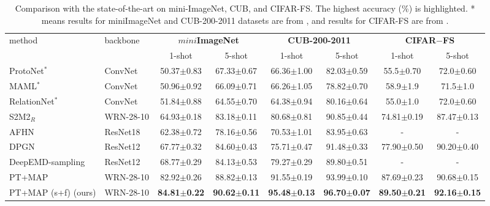 \documentclass[10pt, conference, compsocconf]{IEEEtran}
\begin{document}
\begin{table*}[t]
\centering
\caption{Comparison with the state-of-the-art on mini-ImageNet, CUB, and CIFAR-FS. The highest accuracy (\%) is highlighted. * means results for miniImageNet and CUB-200-2011 datasets are from \cite{chen2019closer}, and results for CIFAR-FS are from \cite{bertinetto2018meta}.}\begin{tabular}{l|l|cc||cc||cc}
\toprule
\multirow{2}{*}{method} & \multirow{2}{*}{backbone} & \multicolumn{2}{c||}{\bf{$\textit{mini}$ImageNet}} & \multicolumn{2}{c||}{\bf{CUB-200-2011}} & \multicolumn{2}{c}{\bf{CIFAR$-$FS}}  \\
& & 1-shot& 5-shot& 1-shot& 5-shot& 1-shot& 5-shot\\ \hline

ProtoNet$^{*}$ \cite{snell2017prototypical}& ConvNet&  50.37$\pm$0.83 & 67.33$\pm$0.67 & 66.36$\pm$1.00  & 82.03$\pm$0.59 & 55.5$\pm$0.70 & 72.0$\pm$0.60  \\
MAML$^{*}$ \cite{finn2017model} & ConvNet&  50.96$\pm$0.92 & 66.09$\pm$0.71 & 66.26$\pm$1.05 & 78.82$\pm$0.70 & 58.9$\pm$1.9 & 71.5$\pm$1.0\\
RelationNet$^{*}$ \cite{sung2018learning}& ConvNet&  51.84$\pm$0.88 & 64.55$\pm$0.70 & 64.38$\pm$0.94 & 80.16$\pm$0.64 & 55.0$\pm$1.0 & 72.0$\pm$0.60\\ \hline

S2M2$_{R}$ \cite{mangla2020charting}&WRN-28-10 & 64.93$\pm$0.18 &83.18$\pm$0.11 & 80.68$\pm$0.81 &90.85$\pm$0.44 & 74.81$\pm$0.19 &87.47$\pm$0.13 \\
AFHN \cite{li2020adversarial}& ResNet18  & 62.38$\pm$0.72 & 78.16$\pm$0.56 & 70.53$\pm$1.01 & 83.95$\pm$0.63 & - & -\\
DPGN \cite{yang2020dpgn}& ResNet12  & 67.77$\pm$0.32 & 84.60$\pm$0.43 & 75.71$\pm$0.47 & 91.48$\pm$0.33 & 77.90$\pm$0.50 & 90.20$\pm$0.40 \\
DeepEMD-sampling \cite{zhang2020deepemd}& ResNet12  & 68.77$\pm$0.29 & 84.13$\pm$0.53 & 79.27$\pm$0.29 & 89.80$\pm$0.51 & - & - \\
PT+MAP \cite{hu2020leveraging} & WRN-28-10 &82.92$\pm$0.26 & 88.82$\pm$0.13 &91.55$\pm$0.19 & 93.99$\pm$0.10 &87.69$\pm$0.23 & 90.68$\pm$0.15\\\hline
PT+MAP (s+f) (ours) &WRN-28-10  &{}{\bf{84.81$\pm$0.22}} & {}{\bf{90.62$\pm$0.11}} &{}{\bf{95.48$\pm$0.13}} & \bf{96.70$\pm$0.07} &{}{\bf{89.50$\pm$0.21}} & {}{\bf{92.16$\pm$0.15}} \\
\bottomrule

\end{tabular}
\label{table6}
\end{table*}
\end{document}
